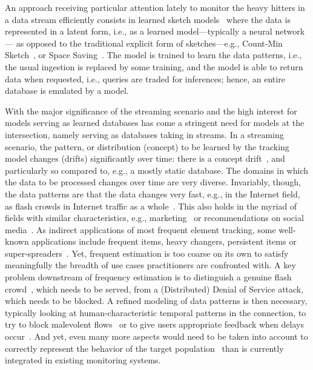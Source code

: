 An approach receiving particular attention lately to monitor the heavy hitters in a data stream efficiently consists in learned sketch models~\cite{hsu2019learning,kristo2020case,patil2021latest} where the data is represented in a latent form, i.e., as a learned model---typically a neural network--- as opposed to the traditional explicit form of sketches---e.g., Count-Min Sketch~\cite{cormode2005improved}, or Space Saving~\cite{mitzenmacher2012hierarchical}. The model is trained to learn the data patterns, i.e., the usual ingestion is replaced by some training, and the model is able to return data when requested, i.e., queries are traded for inferences; hence, an entire database is emulated by a model.

With the major significance of the streaming scenario and the high interest for models serving as learned databases has come a stringent need for models at the intersection, namely serving as databases taking in streams. In a streaming scenario, the pattern, or distribution (concept) to be learned by the tracking model changes (drifts) significantly over time: there is a concept drift~\cite{Widmer1996,yu2021automatic}, and particularly so compared to, e.g., a mostly static database.
The domains in which the data to be processed changes over time are very diverse. Invariably, though,
the data patterns are that the data changes very fast, e.g., in the Internet field, as flash crowds in Internet traffic as a whole~\cite{ari2003managing}.
This also holds in the myriad of fields with similar characteristics, e.g., marketing~\cite{kotler2005role} or recommendations on social media~\cite{}.
%
As indirect applications of most frequent element tracking, some well-known applications include frequent items, heavy changers, persistent items or super-spreaders~\cite{li2020wavingsketch}.
%
Yet, frequent estimation is too coarse on its own to satisfy meaningfully the breadth of use cases practitioners are confronted with. A key problem downstream of frequency estimation is to distinguish a genuine flash crowd~\cite{ari2003managing,oikonomou2009modeling}, which needs to be served, from a (Distributed) Denial of Service attack, which needs to be blocked. A refined modeling of data patterns is then necessary, typically looking at human-characteristic temporal patterns in the connection, to try to block malevolent flows~\cite{tandon2021defending} or to give users appropriate feedback when delays occur~\cite{tada2021mitigation}. And yet, even many more aspects would need to be taken into account to correctly represent the behavior of the target population~\cite{aljohani2021conducting} than is currently integrated in existing monitoring systems.
